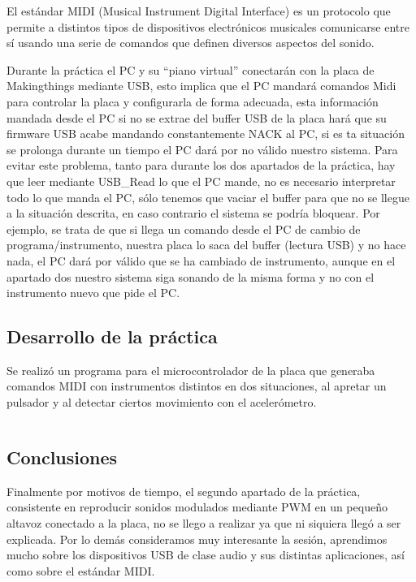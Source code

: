 \documentclass[a4paper, 11pt]{article}
\begin{document}
El estándar MIDI (Musical Instrument Digital Interface) es un protocolo que
permite a distintos tipos de dispositivos electrónicos musicales comunicarse
entre sí usando una serie de comandos que definen diversos aspectos del sonido.

Durante la práctica el PC y su “piano virtual” conectarán con la placa de
Makingthings mediante USB, esto implica que el PC mandará comandos Midi para
controlar la placa y configurarla de forma adecuada, esta información mandada
desde el PC si no se extrae del buffer USB de la placa hará que su firmware USB
acabe mandando constantemente NACK al PC, si es ta situación se prolonga
durante un tiempo el PC dará por no válido nuestro sistema. Para evitar este
problema, tanto para durante los dos apartados de la práctica, hay que leer
mediante USB\_Read lo que el PC mande, no es necesario interpretar todo lo que
manda el PC, sólo tenemos que vaciar el buffer para que no se llegue a la
situación descrita, en caso contrario el sistema se podría bloquear. Por
ejemplo, se trata de que si llega un comando desde el PC de cambio de
programa/instrumento, nuestra placa lo saca del buffer (lectura USB) y no hace
nada, el PC dará por válido que se ha cambiado de instrumento, aunque en el
apartado dos nuestro sistema siga sonando de la misma forma y no con el
instrumento nuevo que pide el PC.

\subsection{Desarrollo de la práctica}
Se realizó un programa para el microcontrolador de la placa que
generaba comandos MIDI con instrumentos distintos en dos
situaciones, al apretar un pulsador y al detectar ciertos
movimiento con el acelerómetro.
\inputminted[tabsize=4, fontsize=\small]{c}{prac8-main.c}

\subsection{Conclusiones}
Finalmente por motivos de tiempo, el segundo apartado de la
práctica, consistente en reproducir sonidos modulados mediante PWM
en un pequeño altavoz conectado a la placa, no se llego a realizar
ya que ni siquiera llegó a ser explicada. Por lo demás consideramos
muy interesante la sesión, aprendimos mucho sobre los dispositivos
USB de clase audio y sus distintas aplicaciones, así como sobre el
estándar MIDI.
\end{document}
